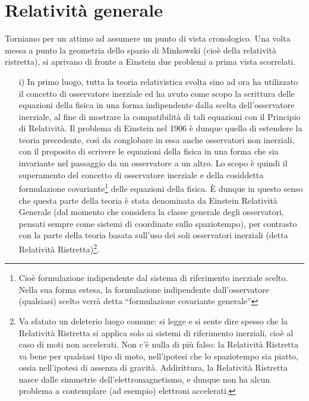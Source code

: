 \chapter{Relatività generale}

Torniamo per un attimo ad assumere un punto di vista cronologico. Una
volta messa a punto la geometria dello spazio di Minkowski (cioè della relatività 
ristretta), si aprivano di fronte a Einstein due problemi a prima vista
scorrelati.

\begin{enumerate}
 \item[i)] In primo luogo, tutta la teoria relativistica svolta sino ad ora ha utilizzato 
il concetto di osservatore inerziale ed ha avuto come scopo la
scrittura delle equazioni della fisica in una forma indipendente dalla
scelta dell'osservatore inerziale, al fine di mostrare la compatibilità di
tali equazioni con il Principio di Relatività. 
Il problema di Einstein nel 1906 è dunque quello di estendere la teoria precedente, così da
conglobare in essa anche osservatori non inerziali, con il proposito di
scrivere le equazioni della fisica in una forma che sia invariante nel passaggio 
da un osservatore a un altro. Lo scopo è quindi il superamento del concetto di osservatore inerziale e della cosiddetta 
formulazione covariante\footnote{Cioè formulazione indipendente dal sistema di riferimento inerziale scelto. Nella sua
forma estesa, la formulazione indipendente dall'osservatore (qualsiasi) scelto verrà detta ``formulazione covariante generale''}
delle equazioni della fisica.
È dunque in questo senso che questa parte della teoria è stata denominata da 
Einstein Relatività Generale (dal momento che considera la classe generale 
degli osservatori, pensati sempre come sistemi di coordinate sullo spaziotempo), per contrasto con la parte della teoria basata
sull'uso dei soli osservatori inerziali (detta Relatività Ristretta)\footnote{Va 
sfatato un deleterio luogo comune: si legge e si sente dire spesso che la Relatività
Ristretta si applica solo ai sistemi di riferimento inerziali, cioè al caso di moti non accelerati. 
Non c'è nulla di più falso: la Relatività Ristretta va bene per qualsiasi tipo di moto, nell'ipotesi che 
lo spaziotempo sia piatto, ossia nell'ipotesi di assenza di gravità. Addirittura, 
la Relatività Ristretta nasce dalle simmetrie dell'elettromagnetismo, e dunque non
ha alcun problema a contemplare (ad esempio) elettroni accelerati.}.


\end{enumerate}
